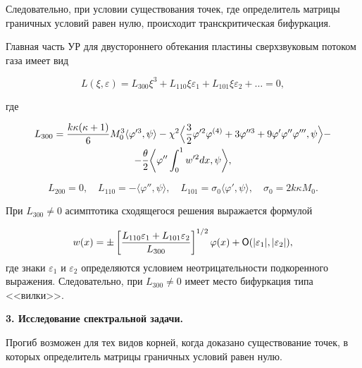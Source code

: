 Следовательно, при условии существования точек, где определитель матрицы граничных условий равен нулю, происходит транскритическая бифуркация.



Главная часть УР для двустороннего обтекания пластины сверхзвуковым потоком газа имеет вид

$$

L(\xi,\varepsilon)=L_{300}\xi^3 +L_{110}\xi\varepsilon_1+L_{101}\xi\varepsilon_2+\ldots =0,

$$

где

\begin{multline}

L_{300}=\frac{k\kappa(\kappa+1)}{6}M_0^3 \langle\varphi'^3,\psi\rangle-

\chi^2\Bigl\langle\frac{3}{2}\varphi '^2\varphi^{(4)}+3\varphi''^3+9\varphi'\varphi''\varphi''',\psi \Bigr\rangle-  \\ -

\frac{\theta}{2} \biggl\langle\varphi''\int_0^1 w'^2dx,\psi\biggr\rangle,

\end{multline}

$$L_{200}=0,\quad 

L_{110}=-\langle\varphi'', \psi\rangle,\quad  

L_{101}=\sigma_0\langle\varphi', \psi\rangle,

\quad \sigma_0=2k\kappa M_0.$$

При $L_{300}\neq 0$ асимптотика сходящегося решения выражается формулой 

$$

w(x)=\pm \left[\frac{L_{110}\varepsilon_1+L_{101}\varepsilon_2}{L_{300}}\right]^{1/2}\varphi(x)+{\sf O}(|\varepsilon_1|,|\varepsilon_2|),

$$ где знаки $\varepsilon_1$ и $\varepsilon_2$  определяются условием неотрицательности подкоренного  выражения. Следовательно, при $L_{300}\neq 0$ имеет место бифуркация типа <<вилки>>.





\smallskip 

\textbf{3. Исследование спектральной задачи.}

Прогиб возможен для тех видов корней, когда доказано существование точек, в которых определитель матрицы граничных условий равен нулю.



\smallskip 



